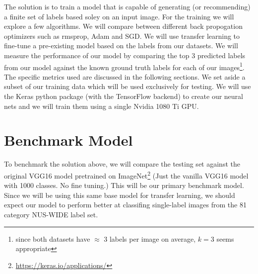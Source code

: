\documentclass[10pt, a4paper, twocolumn]{article} %
\begin{document}

The solution is to train a model that is capable of generating (or recommending) a finite set of labels based soley on an input image.  For the training we will explore a few algorithms.  We will compare between different back propogation optimizers such as rmsprop, Adam and SGD.  We will use transfer learning to fine-tune a pre-existing model based on the labels from our datasets.  We will measure the performance of our model by comparing the top 3 predicted labels from our model against the known ground truth labels for each of our images\footnote{since both datasets have $\approx$ 3 labels per image on average, $k = 3$ seems appropriate}.  The specific metrics used are discussed in the following sections. We set aside a subset of our training data which will be used exclusively for testing. We will use the Keras python package (with the TensorFlow backend) to create our neural nets and we will train them using a single Nvidia 1080 Ti GPU.

\section{Benchmark Model\label{sec:5}} %


To benchmark the solution above, we will compare the testing set against the original VGG16 model pretrained on ImageNet\footnote{\url{https://keras.io/applications/}} (Just the vanilla VGG16 model with 1000 classes. No fine tuning.) This will be our primary benchmark model. Since we will be using this same base model for transfer learning, we should expect our model to perform better at classifing single-label images from the 81 category NUS-WIDE label set.
\end{document}
